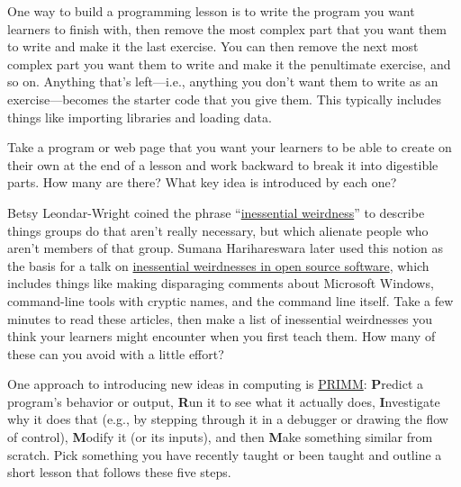 
One way to build a programming lesson is to write the program you want
learners to finish with, then remove the most complex part that you
want them to write and make it the last exercise. You can then remove
the next most complex part you want them to write and make it the
penultimate exercise, and so on. Anything that's left---i.e., anything
you don't want them to write as an exercise---becomes the starter code
that you give them. This typically includes things like importing
libraries and loading data.

Take a program or web page that you want your learners to be able to
create on their own at the end of a lesson and work backward to break
it into digestible parts.  How many are there?  What key idea is
introduced by each one?


Betsy Leondar-Wright coined the phrase
``\href{http://www.classmatters.org/2006_07/its-not-them.php}{inessential
  weirdness}'' to describe things groups do that aren't really
necessary, but which alienate people who aren't members of that group.
Sumana Harihareswara later used this notion as the basis for a talk on
\href{https://www.harihareswara.net/sumana/2016/05/21/0}{inessential
  weirdnesses in open source software}, which includes things like
making disparaging comments about Microsoft Windows, command-line
tools with cryptic names, and the command line itself.  Take a few
minutes to read these articles, then make a list of inessential
weirdnesses you think your learners might encounter when you first
teach them. How many of these can you avoid with a little effort?


One approach to introducing new ideas in computing is
\href{http://blogs.kcl.ac.uk/cser/2017/09/01/primm-a-structured-approach-to-teaching-programming/}{PRIMM}:
\textbf{P}redict a program's behavior or output, \textbf{R}un it to
see what it actually does, \textbf{I}nvestigate why it does that
(e.g., by stepping through it in a debugger or drawing the flow of
control), \textbf{M}odify it (or its inputs), and then \textbf{M}ake
something similar from scratch.  Pick something you have recently
taught or been taught and outline a short lesson that follows these
five steps.


